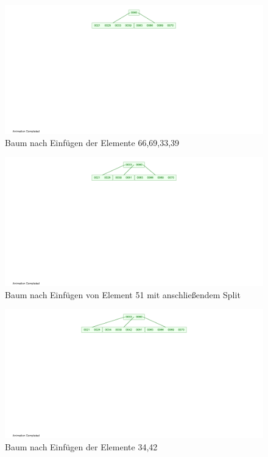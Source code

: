 \documentclass[12pt]{scrartcl}
\begin{document}
\begin{figure}[h!]
\begin{center}
\includegraphics[scale=0.5]{B-Tree3.png}
\caption{Baum nach Einfügen der Elemente 66,69,33,39}
\end{center}
\end{figure}

\begin{figure}[h!]
\begin{center}
\includegraphics[scale=0.5]{B-Tree4.png}
\caption{Baum nach Einfügen von Element 51 mit anschließendem Split}
\end{center}
\end{figure}

\begin{figure}[h!]
\begin{center}
\includegraphics[scale=0.5]{B-Tree5.png}
\caption{Baum nach Einfügen der Elemente 34,42}
\end{center}
\end{figure}
\end{document}
